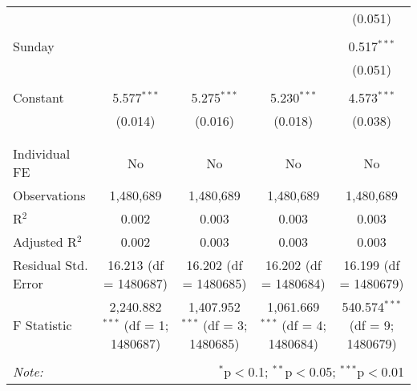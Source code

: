 \documentclass[
]{article}
\begin{document}
\begin{table}[!htbp]
{\begin{tabular}{@{\extracolsep{5pt}}lcccc}
  &  &  &  & (0.051) \\ 
  & & & & \\ 
 Sunday &  &  &  & 0.517$^{***}$ \\ 
  &  &  &  & (0.051) \\ 
  & & & & \\ 
 Constant & 5.577$^{***}$ & 5.275$^{***}$ & 5.230$^{***}$ & 4.573$^{***}$ \\ 
  & (0.014) & (0.016) & (0.018) & (0.038) \\ 
  & & & & \\ 
\hline \\[-1.8ex] 
Individual FE & No & No & No & No \\ 
Observations & 1,480,689 & 1,480,689 & 1,480,689 & 1,480,689 \\ 
R$^{2}$ & 0.002 & 0.003 & 0.003 & 0.003 \\ 
Adjusted R$^{2}$ & 0.002 & 0.003 & 0.003 & 0.003 \\ 
Residual Std. Error & 16.213 (df = 1480687) & 16.202 (df = 1480685) & 16.202 (df = 1480684) & 16.199 (df = 1480679) \\ 
F Statistic & 2,240.882$^{***}$ (df = 1; 1480687) & 1,407.952$^{***}$ (df = 3; 1480685) & 1,061.669$^{***}$ (df = 4; 1480684) & 540.574$^{***}$ (df = 9; 1480679) \\ 
\hline 
\hline \\[-1.8ex] 
\textit{Note:}  & \multicolumn{4}{r}{$^{*}$p$<$0.1; $^{**}$p$<$0.05; $^{***}$p$<$0.01} \\ 
\end{tabular}
} 
\end{table} 
\newpage
\end{document}
